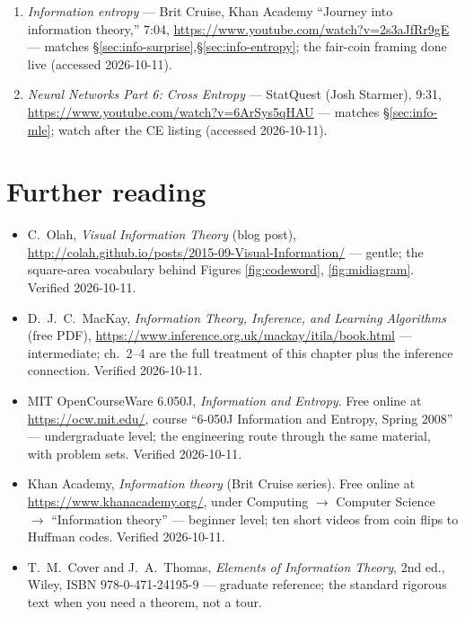 \begin{rulebox}
\begin{enumerate}
\item \emph{Information entropy} --- Brit Cruise, Khan Academy
``Journey into information theory,'' 7:04,
\url{https://www.youtube.com/watch?v=2s3aJfRr9gE} --- matches
\S\ref{sec:info-surprise},\S\ref{sec:info-entropy}; the
fair-coin framing done live (accessed 2026-10-11).
\item \emph{Neural Networks Part 6: Cross Entropy} --- StatQuest
(Josh Starmer), 9:31,
\url{https://www.youtube.com/watch?v=6ArSys5qHAU} --- matches
\S\ref{sec:info-mle}; watch after the CE listing (accessed 2026-10-11).
\end{enumerate}
\end{rulebox}

\section*{Further reading}

\begin{itemize}
\item C.~Olah, \emph{Visual Information Theory} (blog post),
\url{http://colah.github.io/posts/2015-09-Visual-Information/} ---
gentle; the square-area vocabulary behind Figures \ref{fig:codeword},
\ref{fig:midiagram}. Verified 2026-10-11.
\item D.~J.~C.~MacKay, \emph{Information Theory, Inference, and
Learning Algorithms} (free PDF),
\url{https://www.inference.org.uk/mackay/itila/book.html} ---
intermediate; ch.~2--4 are the full treatment of this chapter plus the
inference connection. Verified 2026-10-11.
\item MIT OpenCourseWare 6.050J, \emph{Information and Entropy}.
Free online at \url{https://ocw.mit.edu/}, course ``6-050J
Information and Entropy, Spring 2008'' --- undergraduate level; the
engineering route through the same material, with problem sets.
Verified 2026-10-11.
\item Khan Academy, \emph{Information theory} (Brit Cruise series).
Free online at \url{https://www.khanacademy.org/}, under Computing
$\to$ Computer Science $\to$ ``Information theory'' --- beginner
level; ten short videos from coin flips to Huffman codes. Verified
2026-10-11.
\item T.~M.~Cover and J.~A.~Thomas, \emph{Elements of Information
Theory}, 2nd ed., Wiley, ISBN 978-0-471-24195-9 --- graduate
reference; the standard rigorous text when you need a theorem, not a
tour.
\end{itemize}

